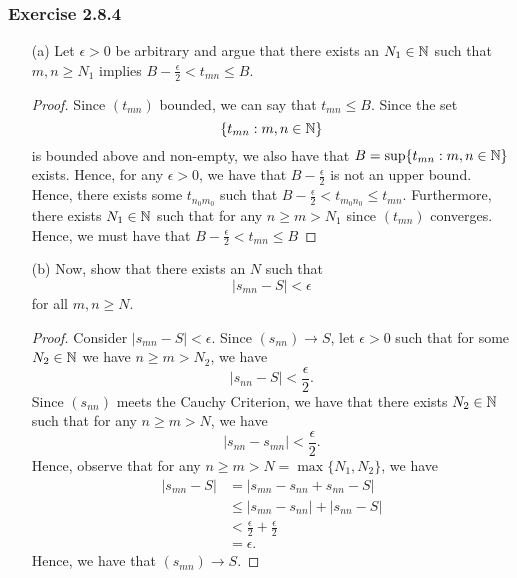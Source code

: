         \subsubsection{Exercise 2.8.4}     
        \begin{enumerate}
            \item[(a)] Let \( \epsilon > 0  \) be arbitrary and argue that there exists an \(  N_1 \in \mathbb{N}  \) such that \( m,n \geq  N_1 \) implies \( B - \frac{ \epsilon  }{ 2 } < t_{mn} \leq  B.\)
                \begin{proof}
                    Since \( (t_{mn}) \) bounded, we can say that \( t_{mn} \leq B \). Since the set 
                    \[  \{ t_{mn} : m,n \in \mathbb{N} \}  \]
                    is bounded above and non-empty, we also have that 
                    \( B = \sup \{ t_{mn}: m,n \in \mathbb{N}  \}  \) exists. Hence, for any \( \epsilon > 0  \), we have that \( B - \frac{ \epsilon  }{ 2 }  \) is not an upper bound. Hence, there exists some \( t_{n_0 m_0} \) such that \( B - \frac{ \epsilon  }{ 2 } < t_{m_0 n_0} \leq t_{mn}\). Furthermore, there exists \( N_1 \in \mathbb{N}  \) such that for any \(  n \geq m > N_1  \) since \( (t_{mn}) \) converges. Hence,  we must have that 
                    \( B - \frac{ \epsilon  }{ 2 } < t_{mn} \leq B \)
                \end{proof}
            \item[(b)] Now, show that there exists an \( N  \) such that 
            \[ | s_{mn} - S  | < \epsilon \]
            for all \( m,n \geq N \).
            \begin{proof}
                Consider \(  | s_{mn} - S  | < \epsilon \). Since \(  (s_{nn}) \to S  \), let \( \epsilon > 0  \) such that for some \( N_2 \in \mathbb{N}  \) we have \( n \geq m > N_2  \), we have
                \[ | s_{nn} - S  | < \frac{ \epsilon  }{ 2 } . \]
                Since \( (s_{nn}) \) meets the Cauchy Criterion, we have that there exists \( N_2 \in \mathbb{N}  \) such that for any \( n \geq m > N  \), we have 
                \[ | s_{nn} - s_{mn} | < \frac{ \epsilon  }{ 2 }.   \]
                Hence, observe that for any \( n \geq m > N = \max \{ N_1, N_2 \}  \), we have
                \begin{align*}
                    | s_{mn} - S  | &= | s_{mn} - s_{nn} + s_{nn} - S  |  \\
                                    &\leq  | s_{mn} - s_{nn} | + | s_{nn} - S  | \\ 
                                    &< \frac{ \epsilon  }{ 2 } + \frac{ \epsilon  }{ 2 } \\
                                    &= \epsilon.
                \end{align*}
                Hence, we have that \( (s_{mn} ) \to S \). 
            \end{proof}
        \end{enumerate}

